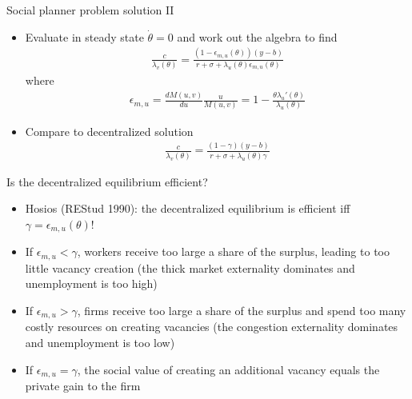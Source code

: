 \documentclass[9pt]{beamer}
\newcommand{\bit}{\begin{itemize}}
\newcommand{\eit}{\end{itemize}}
\begin{document}
\begin{frame}{Social planner problem solution II}

\bit
\setlength\itemsep{2em}

\item Evaluate in steady state $\dot \theta=0$ and work out the algebra to find
\begin{eqnarray}
\frac{c}{\lambda_v(\theta)} = \frac{(1-\epsilon_{m,u}(\theta))(y-b)}{r+\sigma + \lambda_u(\theta)\epsilon_{m,u}(\theta)} \nonumber
\end{eqnarray}
where 
\begin{eqnarray}
\epsilon_{m,u} = \frac{d M(u,v)}{du} \frac{u}{M(u,v)} = 1- \frac{\theta \lambda_u'(\theta)}{\lambda_u(\theta)} \nonumber
\end{eqnarray}

\item Compare to decentralized solution
\begin{eqnarray}
\frac{c}{\lambda_v(\theta)} = \frac{(1-\gamma)(y-b)}{r + \sigma + \lambda_u(\theta) \gamma} \nonumber
\end{eqnarray} 


\eit
\end{frame}



\begin{frame}{Is the decentralized equilibrium efficient?}

\bit
\setlength\itemsep{2em}

\item Hosios (REStud 1990): the decentralized equilibrium is efficient iff $\gamma = \epsilon_{m,u}(\theta)$!

\item If $\epsilon_{m,u}<\gamma$, workers receive too large a share of the surplus, leading to too little vacancy creation (the thick market externality dominates and unemployment is too high)

\item If $\epsilon_{m,u}>\gamma$, firms receive too large a share of the surplus and spend too many costly resources on creating vacancies (the congestion externality dominates and unemployment is too low)

\item If $\epsilon_{m,u} = \gamma$, the social value of creating an additional vacancy equals the private gain to the firm


\eit
\end{frame}
\end{document}
